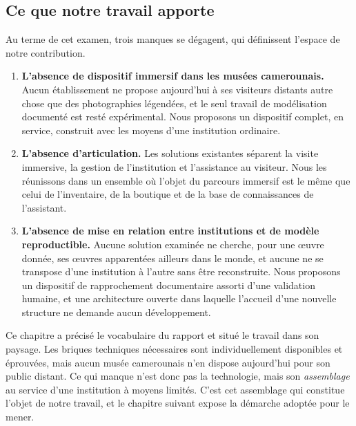 \subsection{Ce que notre travail apporte}

Au terme de cet examen, trois manques se dégagent, qui définissent l'espace de
notre contribution.

\begin{enumerate}
  \item \textbf{L'absence de dispositif immersif dans les musées camerounais.}
        Aucun établissement ne propose aujourd'hui à ses visiteurs distants
        autre chose que des photographies légendées, et le seul travail de
        modélisation documenté est resté expérimental. Nous proposons un
        dispositif complet, en service, construit avec les moyens d'une
        institution ordinaire.

  \item \textbf{L'absence d'articulation.} Les solutions existantes séparent la
        visite immersive, la gestion de l'institution et l'assistance au
        visiteur. Nous les réunissons dans un ensemble où l'objet du parcours
        immersif est le même que celui de l'inventaire, de la boutique et de la
        base de connaissances de l'assistant.

  \item \textbf{L'absence de mise en relation entre institutions et de modèle
        reproductible.} Aucune solution examinée ne cherche, pour une œuvre
        donnée, ses œuvres apparentées ailleurs dans le monde, et aucune ne se
        transpose d'une institution à l'autre sans être reconstruite. Nous
        proposons un dispositif de rapprochement documentaire assorti d'une
        validation humaine, et une architecture ouverte dans laquelle l'accueil
        d'une nouvelle structure ne demande aucun développement.
\end{enumerate}

\conclchap

Ce chapitre a précisé le vocabulaire du rapport et situé le travail dans son
paysage. Les briques techniques nécessaires sont individuellement disponibles et
éprouvées, mais aucun musée camerounais n'en dispose aujourd'hui pour son public
distant. Ce qui manque n'est donc pas la technologie, mais son
\emph{assemblage} au service d'une institution à moyens limités. C'est cet
assemblage qui constitue l'objet de notre travail, et le chapitre suivant expose
la démarche adoptée pour le mener.
